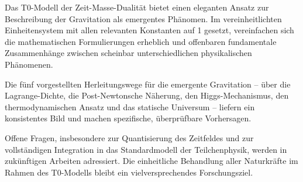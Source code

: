 \documentclass[12pt,a4paper]{article}
\begin{document}
	Das T0-Modell der Zeit-Masse-Dualität bietet einen eleganten Ansatz zur Beschreibung der Gravitation als emergentes Phänomen. Im vereinheitlichten Einheitensystem mit allen relevanten Konstanten auf 1 gesetzt, vereinfachen sich die mathematischen Formulierungen erheblich und offenbaren fundamentale Zusammenhänge zwischen scheinbar unterschiedlichen physikalischen Phänomenen.
	
	Die fünf vorgestellten Herleitungswege für die emergente Gravitation – über die Lagrange-Dichte, die Post-Newtonsche Näherung, den Higgs-Mechanismus, den thermodynamischen Ansatz und das statische Universum – liefern ein konsistentes Bild und machen spezifische, überprüfbare Vorhersagen.
	
	Offene Fragen, insbesondere zur Quantisierung des Zeitfeldes und zur vollständigen Integration in das Standardmodell der Teilchenphysik, werden in zukünftigen Arbeiten adressiert. Die einheitliche Behandlung aller Naturkräfte im Rahmen des T0-Modells bleibt ein vielversprechendes Forschungsziel.
	
\end{document}
